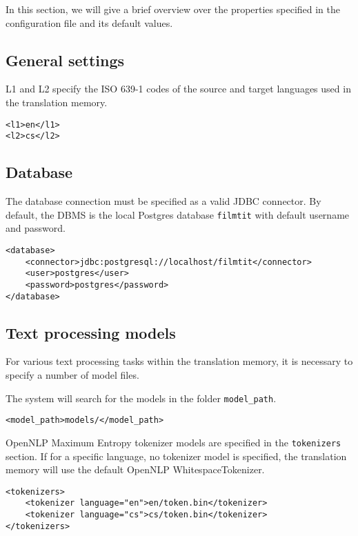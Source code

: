 In this section, we will give a brief overview over the properties specified in the configuration file and its default values.

\subsection{General settings}
L1 and L2 specify the ISO 639-1 codes of the source and target languages used in the translation memory.
\begin{lstlisting}
<l1>en</l1>
<l2>cs</l2>
\end{lstlisting}

\subsection{Database}

The database connection must be specified as a valid JDBC connector. By default, the DBMS is the local Postgres database \verb#filmtit# with default username and password.

\begin{lstlisting}
<database>
    <connector>jdbc:postgresql://localhost/filmtit</connector>
    <user>postgres</user>
    <password>postgres</password>
</database>
\end{lstlisting}

\subsection{Text processing models}

For various text processing tasks within the translation memory, 
it is necessary to specify a number of model files.

The system will search for the models in the folder \verb#model_path#.
\begin{lstlisting}
<model_path>models/</model_path>
\end{lstlisting}

OpenNLP Maximum Entropy tokenizer models are specified in the \verb#tokenizers# section. If for a specific language, no tokenizer model is specified, the translation memory will use the default OpenNLP WhitespaceTokenizer.
\begin{lstlisting}
<tokenizers>
    <tokenizer language="en">en/token.bin</tokenizer>
    <tokenizer language="cs">cs/token.bin</tokenizer>
</tokenizers>
\end{lstlisting}


